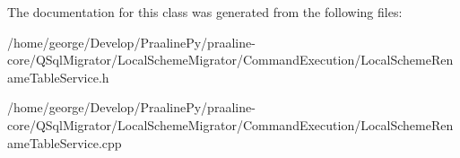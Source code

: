 The documentation for this class was generated from the following files\+:\begin{DoxyCompactItemize}
\item 
/home/george/\+Develop/\+Praaline\+Py/praaline-\/core/\+Q\+Sql\+Migrator/\+Local\+Scheme\+Migrator/\+Command\+Execution/Local\+Scheme\+Rename\+Table\+Service.\+h\item 
/home/george/\+Develop/\+Praaline\+Py/praaline-\/core/\+Q\+Sql\+Migrator/\+Local\+Scheme\+Migrator/\+Command\+Execution/Local\+Scheme\+Rename\+Table\+Service.\+cpp\end{DoxyCompactItemize}
